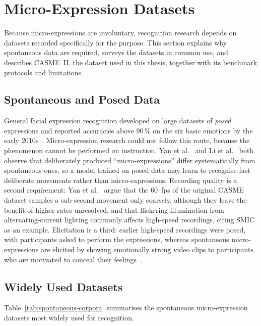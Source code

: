 \section{Micro-Expression Datasets}
\label{sec:corpus}

Because micro-expressions are involuntary, recognition research depends on datasets recorded specifically for the purpose. This section explains why spontaneous data are required, surveys the datasets in common use, and describes CASME~II, the dataset used in this thesis, together with its benchmark protocols and limitations.

\subsection{Spontaneous and Posed Data}
\label{sec:why-spontaneous}

General facial expression recognition developed on large datasets of \textit{posed} expressions and reported accuracies above 90\,\% on the six basic emotions by the early 2010s~\cite{yan2014}. Micro-expression research could not follow this route, because the phenomenon cannot be performed on instruction. Yan et al.~\cite{yan2014} and Li et al.~\cite{liX2013} both observe that deliberately produced ``micro-expressions'' differ systematically from spontaneous ones, so a model trained on posed data may learn to recognise fast deliberate movements rather than micro-expressions. Recording quality is a second requirement: Yan et al.~\cite{yan2014} argue that the 60~fps of the original CASME dataset samples a sub-second movement only coarsely, although they leave the benefit of higher rates unresolved, and that flickering illumination from alternating-current lighting commonly affects high-speed recordings, citing SMIC as an example. Elicitation is a third: earlier high-speed recordings were posed, with participants asked to perform the expressions, whereas spontaneous micro-expressions are elicited by showing emotionally strong video clips to participants who are motivated to conceal their feelings~\cite{liX2013}.

\subsection{Widely Used Datasets}
\label{sec:sibling-corpora}

Table~\ref{tab:spontaneous-corpora} summarises the spontaneous micro-expression datasets most widely used for recognition.

